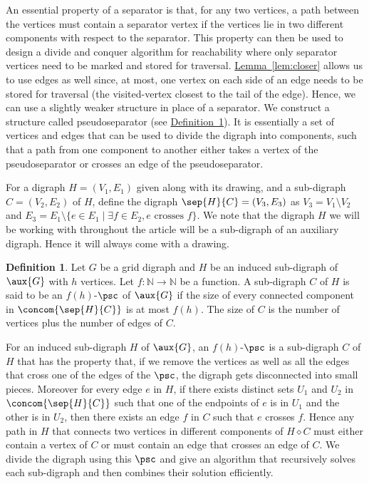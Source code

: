 \documentclass[11pt]{article}
\numberwithin{equation}{section}
\theoremstyle{definition}
\newtheorem{definition}[theorem]{Definition}
\theoremstyle{plain}
\newcommand{\expref}[2]{\hyperref[#2]{#1~\ref{#2}}}
\begin{document}
An essential property of a separator is that, for any two vertices, a path between the vertices must contain a separator vertex if the vertices lie in two different components with respect to the separator. This property can then be used to design a divide and conquer %
algorithm for reachability where only separator vertices need to be marked and stored for traversal. \expref{Lemma}{lem:closer} allows us to use edges as well since, at most, one vertex on each side of an edge needs to be stored for traversal (the visited-vertex closest to the tail of the edge). Hence, we can use a slightly weaker structure in place of a separator. We construct a structure called pseudoseparator (see \expref{Definition}{def:psc}). It is essentially a set of vertices and edges that can be used to divide the %
digraph %
into components, such that a path from one component to another either takes a vertex of the pseudoseparator or crosses an edge of the pseudoseparator.

For a %
digraph %
$H = (V_1, E_1)$ given along with its drawing,
%
%
%
%
%
and a  %
sub-digraph %
$C = (V_2, E_2)$ of $H$, define the 
digraph %
$\sep{H}{C} = (V_3, E_3)$ as $V_3 = V_1 \setminus V_2$ and $E_3 = E_1 \setminus \{e \in E_1 \mid \exists f \in E_2, e \textrm{ crosses } f\}$. We note that the %
digraph %
$H$ we will be working with throughout the article will be a  %
sub-digraph %
 of an auxiliary %
digraph. %
Hence it will always come with a drawing.

\begin{definition}
\label{def:psc}
Let $G$ be a grid %
digraph %
and $H$ be
%
%
an induced  %
sub-digraph %
 of $\aux{G}$ with $h$ vertices. Let $f:\mathbb{N} \rightarrow \mathbb{N}$ be a function. A  %
sub-digraph %
 $C$ of $H$ is said to be an $f(h)$-$\psc$ of $\aux{G}$ if the size of every connected component in $\concom{\sep{H}{C}}$ is at most $f(h)$. The size of $C$ is the
%
%
%
number of vertices plus the number of edges of $C$.
\end{definition}

For
%
an induced%
sub-digraph %
 $H$ of $\aux{G}$, an $f(h)$-$\psc$ is a  %
sub-digraph %
 $C$ of $H$ that has the property that, if we remove the vertices as well as all the edges that cross one of the edges of the $\psc$, the %
digraph %
 gets disconnected into small pieces. Moreover for every edge $e$ in $H$, if there exists distinct sets $U_1$ and $U_2$ in $\concom{\sep{H}{C}}$ such that one of the endpoints of $e$ is in $U_1$ and the other is in $U_2$, then there exists an edge $f$ in $C$ such that $e$ crosses $f$. Hence any path in $H$ that connects two vertices in different components of $H \diamond C$ must either contain a vertex of $C$ or must contain an edge that crosses an edge of $C$. We divide the %
digraph %
 using this $\psc$ and give an algorithm that recursively solves each  %
sub-digraph %
 and then combines their solution efficiently.
\end{document}
